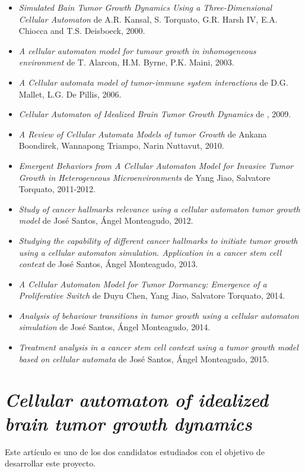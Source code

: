 \begin{itemize}
    \item \textit{Simulated Bain Tumor Growth Dynamics Using a Three-Dimensional Cellular Automaton}
    de A.R. Kansal, S. Torquato, G.R. Harsh IV, E.A. Chiocca and T.S. Deisboeck, 2000.
    \item \textit{A cellular automaton model for tumour growth in inhomogeneous environment}
    de T. Alarcon, H.M. Byrne, P.K. Maini, 2003.
    \item \textit{A Cellular automata model of tumor-immune system interactions}
    de D.G. Mallet, L.G. De Pillis, 2006.
    \item \textit{Cellular Automaton of Idealized Brain Tumor Growth Dynamics}
    de , 2009.
    \item \textit{A Review of Cellular Automata Models of tumor Growth}
    de Ankana Boondirek, Wannapong Triampo, Narin Nuttavut, 2010.
    \item \textit{Emergent Behaviors from A Cellular Automaton Model for Invasive Tumor Growth in Heterogeneous Microenvironments}
    de Yang Jiao, Salvatore Torquato, 2011-2012.
    \item \textit{Study of cancer hallmarks relevance using a cellular automaton tumor growth model}
    de José Santos, Ángel Monteagudo, 2012.
    \item \textit{Studying the capability of different cancer hallmarks to initiate tumor growth using a cellular automaton simulation. Application in a cancer stem cell context}
    de José Santos, Ángel Monteagudo, 2013.
    \item \textit{A Cellular Automaton Model for Tumor Dormancy: Emergence of a Proliferative Switch}
    de Duyu Chen, Yang Jiao, Salvatore Torquato, 2014.
    \item \textit{Analysis of behaviour transitions in tumor growth using a cellular automaton simulation}
    de José Santos, Ángel Monteagudo, 2014.
    \item \textit{Treatment analysis in a cancer stem cell context using a tumor growth model based on cellular automata}
    de José Santos, Ángel Monteagudo, 2015.
\end{itemize}

\section{\textit{Cellular automaton of idealized brain tumor growth dynamics}}

Este artículo \cite{kansal-torquato} es uno de los dos candidatos estudiados con el objetivo
de desarrollar este proyecto.

